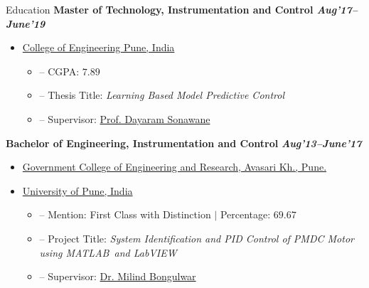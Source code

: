 \documentclass[11pt]{resume}
\newcommand{\mt}{\textsc{MATLAB}}
\newenvironment{outerlist}[1][\enskip\textbullet]%
{\begin{itemize}[#1,leftmargin=*]}{\end{itemize}%
	\vspace{-.5\baselineskip}}
\newenvironment{innerlist}[1][\enskip\textbullet]%
{\begin{itemize}[#1,leftmargin=*,parsep=0pt,itemsep=0pt,topsep=0pt,partopsep=0pt]}
	{\end{itemize}}
\begin{document}
\begin{rSection}{Education}
{\bf{Master of Technology, Instrumentation and Control} \hfill {\textit{Aug'17--June'19}}}
\begin{outerlist}
	\item  \href{http://www.coep.org.in/} {College of Engineering Pune, India}
	\begin{innerlist}
		\item[--] CGPA: $ 7.89 $
		\item[--] Thesis Title: \textit{Learning Based Model Predictive Control}
		\item[--] Supervisor: \href{http://www.coep.org.in/mycoep/dnsinstrucoepacin} {Prof. Dayaram Sonawane}
	\end{innerlist}
\end{outerlist}
\vspace{.1in}
\textbf{{Bachelor of Engineering, Instrumentation and Control}} \hfill \textit{\textbf{Aug'13--June'17}}
\begin{outerlist}
	\item \href{http://www.gcoeara.ac.in/} {Government College of Engineering and Research, Avasari Kh., Pune.}
	\item  \href{http://www.unipune.ac.in/} {University of Pune, India}	
	\begin{innerlist}
		\item[--] Mention:  First Class with Distinction $ \vert $ Percentage: $69.67$
		\item[--] Project Title: \textit{System Identification and PID Control of PMDC Motor using \mt~and LabVIEW}
		\item[--] Supervisor: \href{http://www.gcoeara.ac.in/Instrumentation-control-about-us.php} {Dr. Milind Bongulwar}
	\end{innerlist}
\end{outerlist}
\end{rSection}
\vspace{5mm}
\end{document}
